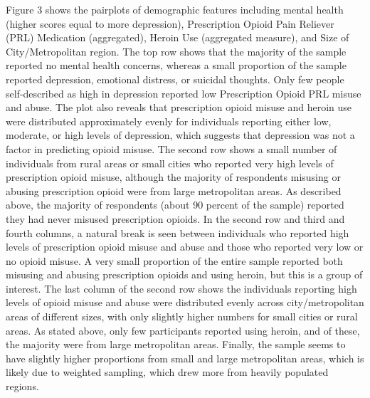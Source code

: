 \documentclass[sigconf]{acmart}
\begin{document}

Figure 3 shows the pairplots of demographic features including mental health
(higher scores equal to more depression), Prescription Opioid Pain Reliever
(PRL) Medication (aggregated), Heroin Use (aggregated measure), and Size of 
City/Metropolitan region. The top row shows that the majority of the sample 
reported no mental health concerns, whereas a small proportion of the sample 
reported depression, emotional distress, or suicidal thoughts. Only few people 
self-described as high in depression reported low Prescription Opioid PRL 
misuse and abuse. The plot also reveals that prescription opioid misuse and 
heroin use were distributed approximately evenly for individuals reporting 
either low, moderate, or high levels of depression, which suggests that 
depression was not a factor in predicting opioid misuse. The second row shows 
a small number of individuals from rural areas or small cities who reported 
very high levels of prescription opioid misuse, although the majority of 
respondents misusing or abusing prescription opioid were from large 
metropolitan areas. As described above, the majority of respondents (about
90 percent of the sample) reported they had never misused prescription 
opioids. In the second row and third and fourth columns, a natural break is 
seen between individuals who reported high levels of prescription opioid 
misuse and abuse and those who reported very low or no opioid misuse. A very 
small proportion of the entire sample reported both misusing and abusing 
prescription opioids and using heroin, but this is a group of interest. The 
last column of the second row shows the individuals reporting high levels of 
opioid misuse and abuse were distributed evenly across city/metropolitan areas 
of different sizes, with only slightly higher numbers for small cities or 
rural areas. As stated above, only few participants reported using heroin, and 
of these, the majority were from large metropolitan areas. Finally, the sample 
seems to have slightly higher proportions from small and large metropolitan 
areas, which is likely due to weighted sampling, which drew more from heavily 
populated regions.
\end{document}
